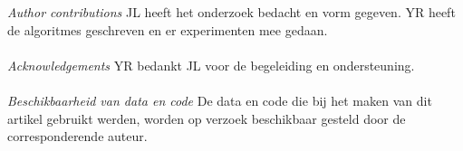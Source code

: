 \textit{Author contributions}
JL heeft het onderzoek bedacht en vorm gegeven.
YR heeft de algoritmes geschreven en er experimenten mee gedaan. \\ \\
\textit{Acknowledgements} 
YR bedankt JL voor de begeleiding en ondersteuning. \\ \\
\textit{Beschikbaarheid van data en code}
De data en code die bij het maken van dit artikel gebruikt werden, worden op verzoek beschikbaar gesteld door de corresponderende auteur.
\newpage